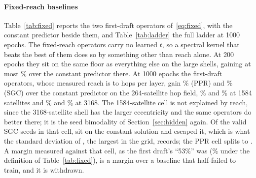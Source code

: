 \documentclass[preprint,11pt,3p]{elsarticle}
\begin{document}
\begin{table}[htbp]
\centering
\caption{Training and test MAE at 1000 epochs, submitted capacity, softplus arm with
$t_{0}=0.5$, mean over valid seeds, on the torus. The training column is the error on the eight
instances each model was fitted to. On the hop field the evaluation instances are copies of the
training instances up to relabelling, and the two columns coincide.}
\label{tab:fit}

\end{table}

\paragraph{Fixed-reach baselines}
Table~\ref{tab:fixed} reports the two first-draft operators of~\eqref{eq:fixed}, with the constant
predictor beside them, and Table~\ref{tab:ladder} the full ladder at 1000 epochs. The fixed-reach
operators carry no learned $t$, so a spectral kernel that beats the best of them does so by
something other than reach alone. At 200 epochs they sit on the same floor as everything else on
the large shells, gaining at most \numFixedLargeMaxGainPct\% over the constant predictor there. At
1000 epochs the first-draft operators, whose measured reach is \numReachPprRoundOneShellOne{} to
\numReachSgcEightShellOne{} hops per layer, gain \numFixedGainPprHopsSmall\% (PPR) and
\numFixedGainSgcHopsSmall\% (SGC) over the constant predictor on the 264-satellite hop field,
\numFixedGainPprHopsShellOne\% and \numFixedGainSgcHopsShellOne\% at 1584 satellites and
\numFixedGainPprHopsDouble\% and \numFixedGainSgcHopsDouble\% at 3168. The 1584-satellite cell
is not explained by reach, since the 3168-satellite shell has the larger eccentricity and the
same operators do better there; it is the seed bimodality of Section~\ref{sec:hidden} again.
Of the \numFixedSgcHopsShellOneN{} valid SGC seeds in that cell, \numFixedSgcHopsShellOneAtConst{}
sit on the constant solution and \numFixedSgcHopsShellOneEscaped{} escaped it, which is what the
standard deviation of \numFixedSgcHopsShellOneSd{}, the largest in the grid, records; the PPR
cell splits \numFixedPprHopsShellOneAtConst{} to \numFixedPprHopsShellOneEscaped{}. A margin
measured against that cell, as the first draft's ``53\%'' was (\numFixedGapPctHopsShellOne\% under the definition of Table~\ref{tab:fixed}), is a margin
over a baseline that half-failed to train, and it is withdrawn.
\end{document}
